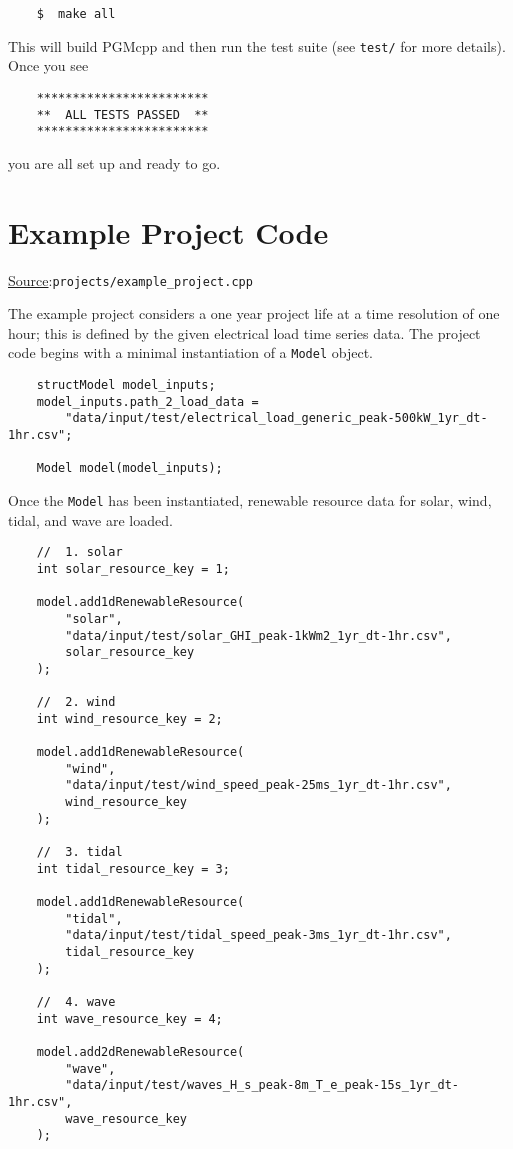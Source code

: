 \documentclass[12pt, letterpaper]{report}
\begin{document}
\begin{verbatim}
    $  make all
\end{verbatim}

\noindent This will build PGMcpp and then run the test suite (see \texttt{test/} for more details). Once you see

\begin{verbatim}
    ************************
    **  ALL TESTS PASSED  **
    ************************
\end{verbatim}

\noindent you are all set up and ready to go.

\section{Example Project Code}

\begin{large}
\noindent\underline{Source}:\quad\texttt{projects/example\_project.cpp}\par
\end{large}
\vspace{5mm}

The example project considers a one year project life at a time resolution of one hour; this is defined by the given electrical load time series data. The project code begins with a minimal instantiation of a \texttt{Model} object.

\begin{verbatim}
    structModel model_inputs;
    model_inputs.path_2_load_data =
        "data/input/test/electrical_load_generic_peak-500kW_1yr_dt-1hr.csv";
    
    Model model(model_inputs);
\end{verbatim}

\noindent Once the \texttt{Model} has been instantiated, renewable resource data for solar, wind, tidal, and wave are loaded.

\newpage
\begin{verbatim}
    //  1. solar
    int solar_resource_key = 1;
     
    model.add1dRenewableResource(
        "solar",
        "data/input/test/solar_GHI_peak-1kWm2_1yr_dt-1hr.csv",
        solar_resource_key
    );
    
    //  2. wind
    int wind_resource_key = 2;
     
    model.add1dRenewableResource(
        "wind",
        "data/input/test/wind_speed_peak-25ms_1yr_dt-1hr.csv",
        wind_resource_key
    );
    
    //  3. tidal
    int tidal_resource_key = 3;
     
    model.add1dRenewableResource(
        "tidal",
        "data/input/test/tidal_speed_peak-3ms_1yr_dt-1hr.csv",
        tidal_resource_key
    );
    
    //  4. wave
    int wave_resource_key = 4;
    
    model.add2dRenewableResource(
        "wave",
        "data/input/test/waves_H_s_peak-8m_T_e_peak-15s_1yr_dt-1hr.csv",
        wave_resource_key
    );
\end{verbatim}
\end{document}

